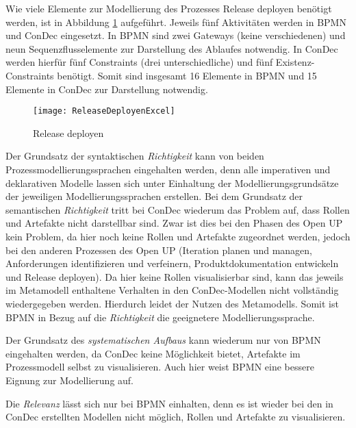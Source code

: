 Wie viele Elemente zur Modellierung des Prozesses Release deployen benötigt werden, ist in Abbildung \ref{fig:ReleaseDeployenExcel} aufgeführt. Jeweils fünf Aktivitäten werden in BPMN und ConDec eingesetzt. In BPMN sind zwei Gateways (keine verschiedenen) und neun Sequenzflusselemente zur Darstellung des Ablaufes notwendig. In ConDec werden hierfür fünf Constraints (drei unterschiedliche)  und fünf Existenz-Constraints benötigt. Somit sind insgesamt 16 Elemente in BPMN und 15 Elemente in ConDec zur Darstellung notwendig. \newline
\begin{figure}[htp]
\begin{center}
  \texttt{[image: ReleaseDeployenExcel]} %
  \caption{Release deployen}
  \label{fig:ReleaseDeployenExcel}
\end{center}
\end{figure}

Der Grundsatz der syntaktischen \textit{Richtigkeit} kann von beiden Prozessmodellierungssprachen eingehalten werden, denn alle imperativen und deklarativen Modelle lassen sich unter Einhaltung der Modellierungsgrundsätze der jeweiligen Modellierungssprachen erstellen.\newline
Bei dem Grundsatz der semantischen \textit{Richtigkeit} tritt bei ConDec wiederum das Problem auf, dass Rollen und Artefakte nicht darstellbar sind. Zwar ist dies bei den Phasen des Open UP kein Problem, da hier noch keine Rollen und Artefakte zugeordnet werden, jedoch bei den anderen Prozessen des Open UP (Iteration planen und managen, Anforderungen identifizieren und verfeinern, Produktdokumentation entwickeln und Release deployen). Da hier keine Rollen visualisierbar sind, kann das jeweils im Metamodell enthaltene Verhalten in den ConDec-Modellen nicht vollständig wiedergegeben werden. Hierdurch leidet der Nutzen des Metamodells. \newline
Somit ist BPMN in Bezug auf die \textit{Richtigkeit} die geeignetere Modellierungssprache.\newline

Der Grundsatz des \textit{systematischen Aufbaus} kann wiederum nur von BPMN eingehalten werden, da ConDec keine Möglichkeit bietet, Artefakte im Prozessmodell selbst zu visualisieren.\newline
Auch hier weist BPMN eine bessere Eignung zur Modellierung auf.\newline

Die \textit{Relevanz} lässt sich nur bei BPMN einhalten, denn es ist wieder bei den in ConDec erstellten Modellen nicht möglich, Rollen und Artefakte zu visualisieren.\newline

